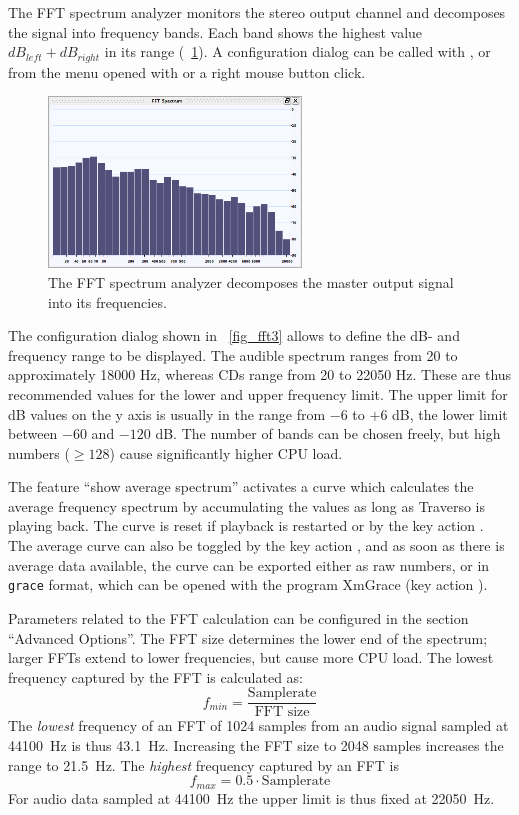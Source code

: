 The FFT spectrum analyzer monitors the stereo output channel and decomposes the signal into frequency bands. Each band shows the highest value $dB_{left} + dB_{right}$ in its range (\FigB\ \ref{fig_fft1}). A configuration dialog can be called with , or from the menu opened with  or a right mouse button click.

\begin{figure}
	\centering
	\includegraphics[width=0.6\textwidth]{images/fft1}
	\caption{The FFT spectrum analyzer decomposes the master output signal into its frequencies.}
	\label{fig_fft1}
\end{figure}

The configuration dialog shown in \FigT\ \ref{fig_fft3} allows to define the dB- and frequency range to be displayed. The audible spectrum ranges from 20 to approximately 18000 Hz, whereas CDs range from 20 to 22050 Hz. These are thus recommended values for the lower and upper frequency limit. The upper limit for dB values on the y axis is usually in the range from $-6$ to $+6$ dB, the lower limit between $-60$ and $-120$ dB. The number of bands can be chosen freely, but high numbers ($\geq 128$) cause significantly higher CPU load.

The feature ``show average spectrum'' activates a curve which calculates the average frequency spectrum by accumulating the values as long as Traverso is playing back. The curve is reset if playback is restarted or by the key action . The average curve can also be toggled by the key action , and as soon as there is average data available, the curve can be exported either as raw numbers, or in \texttt{grace} format, which can be opened with the program XmGrace (key action ).

Parameters related to the FFT calculation can be configured in the section ``Advanced Options''. The FFT size determines the lower end of the spectrum; larger FFTs extend to lower frequencies, but cause more CPU load. The lowest frequency captured by the FFT is calculated as:
\[
f_{min} = \frac{\textrm{Samplerate}}{\textrm{FFT size}}
\]
The \emph{lowest} frequency of an FFT of 1024 samples from an audio signal sampled at 44100~Hz is thus 43.1~Hz. Increasing the FFT size to 2048 samples increases the range to 21.5~Hz. The \emph{highest} frequency captured by an FFT is
\[
f_{max} = 0.5 \cdot \textrm{Samplerate}
\]
For audio data sampled at 44100~Hz the upper limit is thus fixed at 22050~Hz.

